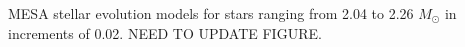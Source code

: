 \label{fig:mesa} MESA stellar evolution models for stars ranging from 2.04 to 2.26 $M_{\odot}$ in increments of 0.02. NEED TO UPDATE FIGURE.